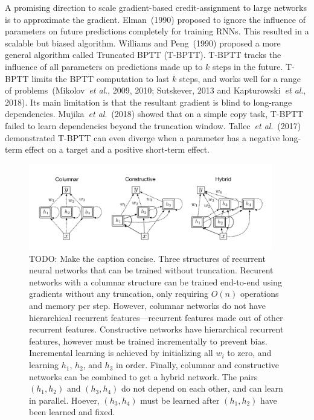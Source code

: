 \documentclass[twoside,11pt]{article}
\newcommand{\etal}{\textit{et al}.}
\begin{document}



A promising direction to scale gradient-based credit-assignment to large networks is to approximate the gradient. Elman~(1990) proposed to ignore the influence of parameters on future predictions completely for training RNNs. This resulted in a scalable but biased algorithm. Williams and Peng~(1990) proposed a more general algorithm called Truncated BPTT (T-BPTT). T-BPTT tracks the influence of all parameters on predictions made up to $k$ steps in the future. T-BPTT limits the BPTT computation to last $k$ steps, and works well for a range of problems~(Mikolov~\etal, 2009, 2010; Sutskever, 2013 and Kapturowski~\etal, 2018). Its main limitation is that the resultant gradient is blind to long-range dependencies. Mujika~\etal~(2018) showed that on a simple copy task, T-BPTT failed to learn dependencies beyond the truncation window. Tallec~\etal~(2017) demonstrated T-BPTT can even diverge when a parameter has a negative long-term effect on a target and a positive short-term effect. 

\begin{figure}
	\centering
	\includegraphics[width=0.95\textwidth]{figures/three_types}
	\caption{TODO: Make the caption concise. Three structures of recurrent neural networks that can be trained without truncation. Recurent networks with a columnar structure can be trained end-to-end using gradients without any truncation, only requiring $O(n)$ operations and memory per step. However, columnar networks do not have hierarchical recurrent features---recurrent features made out of other recurrent features. Constructive networks have hierarchical recurrent features, however must be trained incrementally to prevent bias. Incremental learning is achieved by initializing all $w_i$ to zero, and learning $h_1$, $h_2$, and $h_3$ in order. Finally, columnar and constructive networks can be combined to get a hybrid network. The pairs $(h_1, h_2)$ and $(h_3, h_4)$ do not depend on each other, and can learn in parallel. Hoever, $(h_3, h_4)$ must be learned after $(h_1, h_2)$ have been learned and fixed.}
\end{figure}
\end{document}
